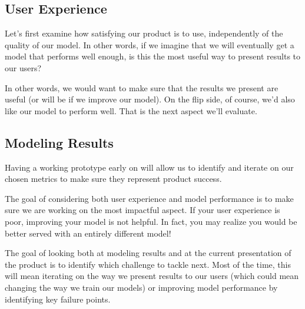 \subsection*{User Experience}
Let's first examine how satisfying our product is to use,
independently of the quality of our model. In other words, if we
imagine that we will eventually get a model that performs well
enough, is this the most useful way to present results to our users?

In other words, we would want to make sure that the results we
present are useful (or will be if we improve our model). On the
flip side, of course, we'd also like our model to perform well.
That is the next aspect we'll evaluate.



\subsection*{Modeling Results}
Having a working prototype early on will allow us to identify and
iterate on our chosen metrics to make sure they represent product
success.

The goal of considering both user experience and model performance
is to make sure we are working on the most impactful aspect. If
your user experience is poor, improving your model is not helpful.
In fact, you may realize you would be better served with an entirely
different model!

The goal of looking both at modeling results and at the current
presentation of the product is to identify which challenge to
tackle next. Most of the time, this will mean iterating on the
way we present results to our users (which could mean changing the
way we train our models) or improving model performance by
identifying key failure points.

